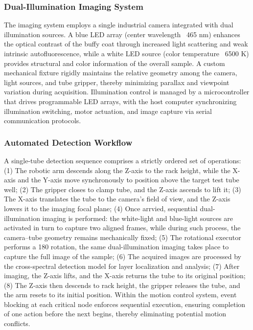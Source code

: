 \subsubsection{Dual-Illumination Imaging System} The imaging system employs a single industrial camera integrated with dual illumination sources. A blue LED array (center wavelength ~465 nm) enhances the optical contrast of the buffy coat through increased light scattering and weak intrinsic autofluorescence, while a white LED source (color temperature ~6500 K) provides structural and color information of the overall sample. A custom mechanical fixture rigidly maintains the relative geometry among the camera, light sources, and tube gripper, thereby minimizing parallax and viewpoint variation during acquisition. Illumination control is managed by a microcontroller that drives programmable LED arrays, with the host computer synchronizing illumination switching, motor actuation, and image capture via serial communication protocols.

\subsubsection{Automated Detection Workflow} A single-tube detection sequence comprises a strictly ordered set of operations: (1) The robotic arm descends along the Z-axis to the rack height, while the X-axis and the Y-axis move synchronously to position above the target test tube well; (2) The gripper closes to clamp tube, and the Z-axis ascends to lift it; (3) The X-axis translates the tube to the camera’s field of view, and the Z-axis lowers it to the imaging focal plane; (4) Once arrvied, sequential dual-illumination imaging is performed: the white-light and blue-light sources are activated in turn to capture two aligned frames, while during such process, the camera–tube geometry remains mechanically fixed; (5) The rotational executor performs a 180 \degree rotation, the same dual-illumination imaging takes place to capture the full image of the sample; (6) The acquired images are processed by the cross-spectral detection model for layer localization and analysis; (7) After imaging, the Z-axis lifts, and the X-axis returns the tube to its original position; (8) The Z-axis then descends to rack height, the gripper releases the tube, and the arm resets to its initial position. Within the motion control system, event blocking at each critical node enforces sequential execution, ensuring completion of one action before the next begins, thereby eliminating potential motion conflicts. 


